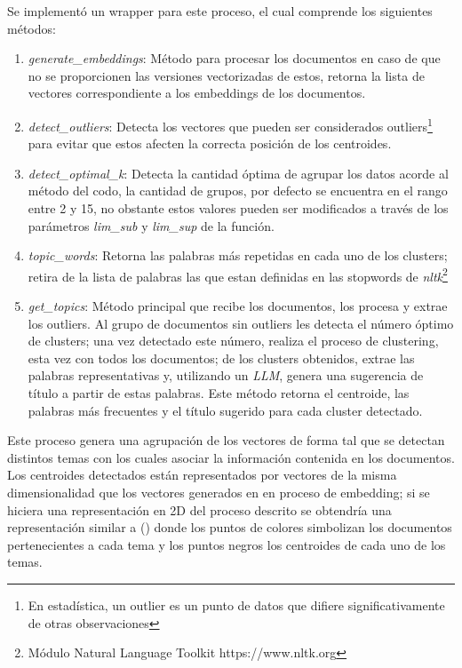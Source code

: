     Se implementó un wrapper para este proceso, el cual comprende los siguientes métodos:
    \begin{enumerate}
        \item \emph{generate\_embeddings}: Método para procesar los documentos en caso de que no se proporcionen las versiones vectorizadas de estos, retorna la lista de vectores correspondiente a los embeddings de los documentos.
        \item \emph{detect\_outliers}: Detecta los vectores que pueden ser considerados outliers\footnote{En estadística, un outlier es un punto de datos que difiere significativamente de otras observaciones} para evitar que estos afecten la correcta posición de los centroides.
        \item \emph{detect\_optimal\_k}: Detecta la cantidad óptima de agrupar los datos acorde al método del codo, la cantidad de grupos, por defecto se encuentra en el rango entre 2 y 15, no obstante estos valores pueden ser modificados a través de los parámetros \emph{lim\_sub} y \emph{lim\_sup} de la función.
        \item \emph{topic\_words}: Retorna las palabras más repetidas en cada uno de los clusters; retira de la lista de palabras las que estan definidas en las stopwords de \emph{nltk}\footnote{Módulo Natural Language Toolkit https://www.nltk.org}
        \item \emph{get\_topics}: Método principal que recibe los documentos, los procesa y extrae los outliers. Al grupo de documentos sin outliers les detecta el número óptimo de clusters; una vez detectado este número, realiza el proceso de clustering, esta vez con todos los documentos; de los clusters obtenidos, extrae las palabras representativas y, utilizando un \emph{LLM}, genera una sugerencia de título a partir de estas palabras. Este método retorna el centroide, las palabras más frecuentes y el título sugerido para cada cluster detectado.
    \end{enumerate}

    Este proceso genera una agrupación de los vectores de forma tal que se detectan distintos temas con los cuales asociar la información contenida en los documentos. Los centroides detectados están representados por vectores de la misma dimensionalidad que los vectores generados en en proceso de embedding; si se hiciera una representación en 2D del proceso descrito se obtendría una representación similar a () donde los puntos de colores simbolizan los documentos pertenecientes a cada tema y los puntos negros los centroides de cada uno de los temas.

